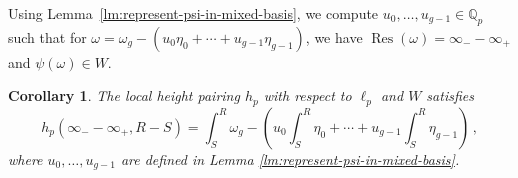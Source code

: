 \documentclass[11pt, a4paper]{amsart}
\newcommand{\Q}{\mathbb{Q}}
\newcommand{\Res}{\operatorname{Res}}
\newtheorem{corollary}[theorem]{Corollary}
\newtheorem{lemma}[theorem]{Lemma}
\theoremstyle{remark}
\newtheorem{remark}[theorem]{Remark}
\numberwithin{equation}{section}
\newcommand{\sg}{{}}
\newcommand{\sm}{{}}
\begin{document}

\sg{Using Lemma~\ref{lm:represent-psi-in-mixed-basis}, we compute $u_0,\ldots,u_{g-1}\in \Q_p$ such that for 
$\omega=\omega_g-(u_0\eta_0+\cdots+u_{g-1}\eta_{g-1})$, we have $\Res(\omega) = \infty_- -\infty_+$ and $\psi(\omega)\in W$.}

\begin{corollary}\label{hpinfformula}
The local  height pairing $h_p$ with respect to $\ell_p$ and $W$ satisfies 
\[
h_p(\infty_- - \infty_+,R-S) = \int_S^R \omega_g -
  (u_0\int_S^R\eta_0+\cdots+u_{g-1}\int_S^R\eta_{g-1})\,,
\]
where $u_0,\ldots,u_{g-1}$ are defined in Lemma \ref{lm:represent-psi-in-mixed-basis}.
\end{corollary}
\end{document}
